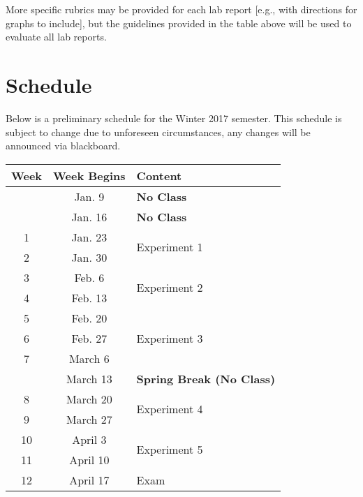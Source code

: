 \bigskip 
More specific rubrics may be provided for each lab report [e.g., with directions for graphs to include], but the guidelines provided in the table above will be used to evaluate all lab reports.

\newpage

\section*{Schedule}
Below is a preliminary schedule for the Winter 2017 semester.
This schedule is subject to change due to unforeseen circumstances, any changes will be announced via blackboard. \\

\begin{tabular}{ |c|c|l| } 
 \hline
 \textbf{Week} & \textbf{Week Begins} & \textbf{Content} \\ 
 \hline
    & Jan. 9 & \textbf{No Class} \\ 
 \hline 
    & Jan. 16 & \textbf{No Class} \\ 
 \hline
 1 & Jan. 23 & \multirow{2}{*}{Experiment 1} \\ 
 \cline{1-2}
 2 & Jan. 30 &  \\ 
 \hline
 3 & Feb. 6 & \multirow{2}{*}{Experiment 2} \\ 
 \cline{1-2}
 4 & Feb. 13 &  \\ 
 \hline
 5 & Feb. 20 & \multirow{3}{*}{Experiment 3} \\ 
 \cline{1-2}
 6 & Feb. 27 &  \\ 
 \cline{1-2}
 7 & March 6 &  \\ 
 \hline
   & March 13 & \textbf{Spring Break (No Class)} \\ 
 \hline
 8 & March 20 & \multirow{2}{*}{Experiment 4} \\ 
 \cline{1-2}
 9 & March 27 &  \\ 
 \hline
 10 & April 3 & \multirow{2}{*}{Experiment 5} \\ 
 \cline{1-2}
 11 & April 10 &  \\ 
 \hline
 12 & April 17 & Exam \\ 
 \hline
\end{tabular}

